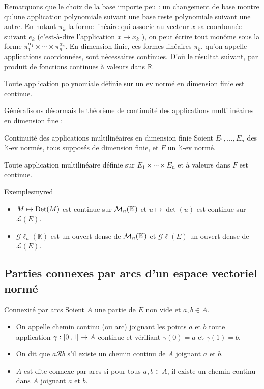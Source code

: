     Remarquons que le choix de la base importe peu : un changement de base montre qu’une application polynomiale suivant une base reste polynomiale suivant une autre.
    En notant $\pi_k$ la forme linéaire qui associe au vecteur $x$ sa coordonnée suivant $e_k$ (c’est-à-dire l’application $x \mapsto x_k$ ), on peut écrire tout monôme sous la forme $\pi_{1}^{\alpha_1} \times \cdots \times \pi_n^{\alpha_n}$. En dimension finie, ces formes linéaires $\pi_k$, qu’on appelle applications coordonnées, sont nécessaires continues. D’où le résultat suivant, par produit de fonctions continues à valeurs dans $\mathbb{R}$.

    \begin{prop}{}{}
        Toute application polynomiale définie sur un ev normé en dimension finie est continue.
    \end{prop}

    Généralisons désormais le théorème de continuité des applications multilinéaires en dimension fine :

    \begin{theo}{Continuité des applications multilinéaires en dimension finie}{}
        Soient $E_1,\ldots, E_n$ des $\mathbb{K}$-ev normés, tous supposés de dimension finie, et $F$ un $\mathbb{K}$-ev normé.

        Toute application multilinéaire définie sur $E_1 \times \cdots \times E_n$ et à valeurs dans $F$ est continue.
    \end{theo}

    \begin{omed}{Exemples}{myred}
        \begin{itemize}
            \item $M \mapsto \operatorname{Det}(M)$ est continue sur $\mathcal{M}_{n}(\mathbb{K})$ et $u \mapsto \det(u)$ est continue sur $\mathcal{L}(E)$.
            \item $\mathcal{G}\ell_n(\mathbb{K})$ est un ouvert dense de $\mathcal{M}_{n}(\mathbb{K})$ et $\mathcal{G}\ell(E)$ un ouvert dense de $\mathcal{L}(E)$.
        \end{itemize}
    \end{omed}

\subsection{Parties connexes par arcs d’un espace vectoriel normé}

    \begin{defi}{Connexité par arcs}{}
        Soient $A$ une partie de $E$ non vide et $a,b \in A$. 
        \begin{itemize}
            \item On appelle chemin continu (ou arc) joignant les points $a$ et $b$ toute application $\gamma : \left[ 0 \, , 1 \right] \rightarrow A$ continue et vérifiant $\gamma(0) = a$ et $\gamma(1) = b$. 
            \item On dit que $a \mathcal{R} b$ s’il existe un chemin continu de $A$ joignant $a$ et $b$.
            \item $A$ est dite connexe par arcs si pour tous $a,b \in A$, il existe un chemin continu dans $A$ joignant $a$ et $b$.
        \end{itemize}
    \end{defi}

